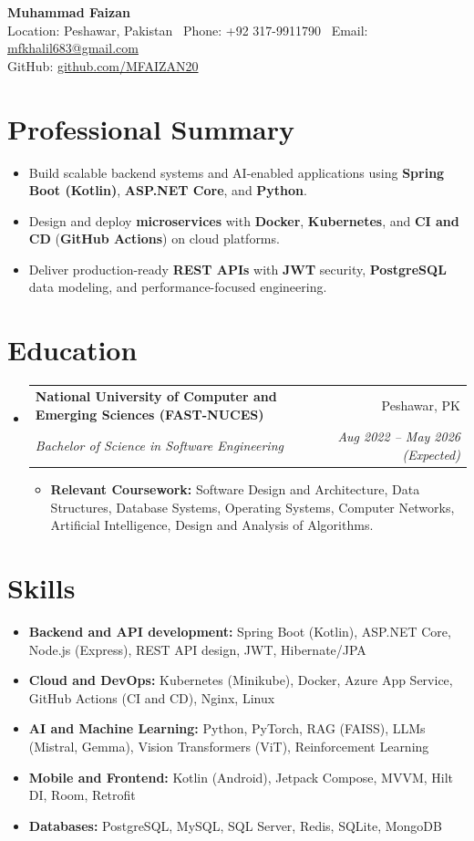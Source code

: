 \documentclass[letterpaper,11pt]{article}
\makeatletter
\newcommand{\resumeItem}[1]{\item\small{{
 #1 \vspace{-2pt}}
}}
\newcommand{\resumeSubheading}[4]{\vspace{-2pt}\item
    \begin{tabular*}{0.97\textwidth}[t]{l@{\extracolsep{\fill}}r}
      \textbf{#1} & #2 \\
      \textit{\small#3} & \textit{\small #4} \\
    \end{tabular*}\vspace{-7pt}
}
\newcommand{\resumeSubHeadingListStart}{\begin{itemize}[leftmargin=0.15in, label={}]}
\newcommand{\resumeSubHeadingListEnd}{\end{itemize}}
\newcommand{\resumeItemListStart}{\begin{itemize}}
\newcommand{\resumeItemListEnd}{\end{itemize}\vspace{-5pt}}
\makeatother
\begin{document}
\begin{center}
    \textbf{\Huge Muhammad Faizan} \\ \vspace{4pt}
    \small Location: Peshawar, Pakistan \textbar\ Phone: +92 317-9911790 \textbar\ Email: \href{mailto:mfkhalil683@gmail.com}{mfkhalil683@gmail.com} \\
    \small GitHub: \href{https://github.com/MFAIZAN20}{github.com/MFAIZAN20}
\end{center}


\section{Professional Summary}
\resumeSubHeadingListStart
    \resumeItem{Build scalable backend systems and AI-enabled applications using \textbf{Spring Boot (Kotlin)}, \textbf{ASP.NET Core}, and \textbf{Python}.}
    \resumeItem{Design and deploy \textbf{microservices} with \textbf{Docker}, \textbf{Kubernetes}, and \textbf{CI and CD} (\textbf{GitHub Actions}) on cloud platforms.}
    \resumeItem{Deliver production-ready \textbf{REST APIs} with \textbf{JWT} security, \textbf{PostgreSQL} data modeling, and performance-focused engineering.}
\resumeSubHeadingListEnd
{}


\section{Education}
  \resumeSubHeadingListStart
    \resumeSubheading
      {National University of Computer and Emerging Sciences (FAST-NUCES)}{Peshawar, PK}
      {Bachelor of Science in Software Engineering}{Aug 2022 -- May 2026 (Expected)}
\resumeItemListStart
        \resumeItem{\textbf{Relevant Coursework:} Software Design and Architecture, Data Structures, Database Systems, Operating Systems, Computer Networks, Artificial Intelligence, Design and Analysis of Algorithms.}
    \resumeItemListEnd
  \resumeSubHeadingListEnd


\section{Skills}
 \resumeSubHeadingListStart
   \resumeItem{\textbf{Backend and API development:} Spring Boot (Kotlin), ASP.NET Core, Node.js (Express), REST API design, JWT, Hibernate/JPA}
   \resumeItem{\textbf{Cloud and DevOps:} Kubernetes (Minikube), Docker, Azure App Service, GitHub Actions (CI and CD), Nginx, Linux}
   \resumeItem{\textbf{AI and Machine Learning:} Python, PyTorch, RAG (FAISS), LLMs (Mistral, Gemma), Vision Transformers (ViT), Reinforcement Learning}
   \resumeItem{\textbf{Mobile and Frontend:} Kotlin (Android), Jetpack Compose, MVVM, Hilt DI, Room, Retrofit}
   \resumeItem{\textbf{Databases:} PostgreSQL, MySQL, SQL Server, Redis, SQLite, MongoDB}
 \resumeSubHeadingListEnd
\end{document}
